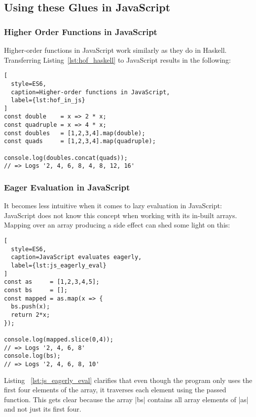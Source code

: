 \subsection{Using these Glues in JavaScript} %
\label{sub:Using these Glues in JavaScript}

\subsubsection{Higher Order Functions in JavaScript} %
\label{subsub:Higher Order Functions in JavaScript}
Higher-order functions in JavaScript work similarly as they do in Haskell.
Transferring Listing~\ref{lst:hof_haskell} to JavaScript results in the
following:

\begin{lstlisting}[
  style=ES6,
  caption=Higher-order functions in JavaScript,
  label={lst:hof_in_js}
]
const double    = x => 2 * x;
const quadruple = x => 4 * x;
const doubles   = [1,2,3,4].map(double);
const quads     = [1,2,3,4].map(quadruple);

console.log(doubles.concat(quads));
// => Logs '2, 4, 6, 8, 4, 8, 12, 16'
\end{lstlisting}

\subsubsection{Eager Evaluation in JavaScript} %
\label{subsub:Eager Evaluation in JavaScript}

It becomes less intuitive when it comes to lazy evaluation in JavaScript:
JavaScript does not know this concept when working with its in-built arrays.
Mapping over an array producing a side effect can shed some light on this:

\begin{lstlisting}[
  style=ES6,
  caption=JavaScript evaluates eagerly,
  label={lst:js_eagerly_eval}
]
const as     = [1,2,3,4,5];
const bs     = [];
const mapped = as.map(x => {
  bs.push(x);
  return 2*x;
});

console.log(mapped.slice(0,4));
// => Logs '2, 4, 6, 8'
console.log(bs);
// => Logs '2, 4, 6, 8, 10'
\end{lstlisting}

Listing ~\ref{lst:js_eagerly_eval} clarifies that even though the program only
uses the first four elements of the array, it traverses each element using the
passed function. This gets clear because the array |bs| contains all array
elements of |as| and not just its first four.

